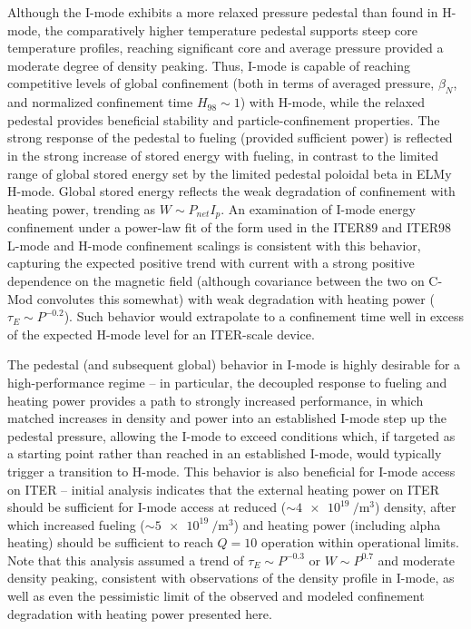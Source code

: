 Although the I-mode exhibits a more relaxed pressure pedestal than found in H-mode, the comparatively higher temperature pedestal supports steep core temperature profiles, reaching significant core and average pressure provided a moderate degree of density peaking.  Thus, I-mode is capable of reaching competitive levels of global confinement (both in terms of averaged pressure, $\beta_N$, and normalized confinement time $H_{98} \sim 1$) with H-mode, while the relaxed pedestal provides beneficial stability and particle-confinement properties.  The strong response of the pedestal to fueling (provided sufficient power) is reflected in the strong increase of stored energy with fueling, in contrast to the limited range of global stored energy set by the limited pedestal poloidal beta in ELMy H-mode.  Global stored energy reflects the weak degradation of confinement with heating power, trending as $W \sim P_{net} I_p$.  An examination of I-mode energy confinement under a power-law fit of the form used in the ITER89 and ITER98 L-mode and H-mode confinement scalings is consistent with this behavior, capturing the expected positive trend with current with a strong positive dependence on the magnetic field (although covariance between the two on C-Mod convolutes this somewhat) with weak degradation with heating power ($\tau_E \sim P^{-0.2}$).  Such behavior would extrapolate to a confinement time well in excess of the expected H-mode level for an ITER-scale device.

The pedestal (and subsequent global) behavior in I-mode is highly desirable for a high-performance regime -- in particular, the decoupled response to fueling and heating power provides a path to strongly increased performance, in which matched increases in density and power into an established I-mode step up the pedestal pressure, allowing the I-mode to exceed conditions which, if targeted as a starting point rather than reached in an established I-mode, would typically trigger a transition to H-mode.  This behavior is also beneficial for I-mode access on ITER -- initial analysis \cite{Whyte2011} indicates that the external heating power on ITER should be sufficient for I-mode access at reduced ($\sim \SI{4e19}{\per\meter\cubed}$) density, after which increased fueling ($\sim \SI{5e19}{\per\meter\cubed}$) and heating power (including alpha heating) should be sufficient to reach $Q=10$ operation within operational limits.  Note that this analysis assumed a trend of $\tau_E \sim P^{-0.3}$ or $W \sim P^{0.7}$ and moderate density peaking, consistent with observations of the density profile in I-mode, as well as even the pessimistic limit of the observed and modeled confinement degradation with heating power presented here.\nicechapterending


